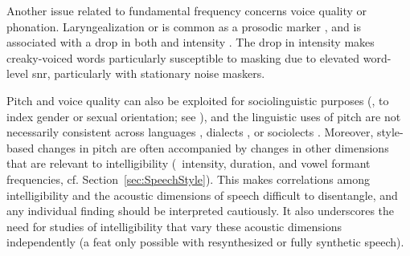 
Another issue related to fundamental frequency concerns voice quality or phonation.  Laryngealization or  is common as a prosodic marker \citep{Lehiste1979, Kreiman1982, DilleyEtAl1996}, and is associated with a drop in both \fo{} and intensity \citep{GordonLadefoged2001}.  The drop in intensity makes creaky-voiced words particularly susceptible to masking due to elevated word-level \ac{snr}, particularly with stationary noise maskers.  %

Pitch and voice quality can also be exploited for sociolinguistic purposes (\ie, to index gender or sexual orientation; see \citealt[\intal]{McconnellGinet1978, Gaudio1994, Podesva2011}), and the linguistic uses of pitch are not necessarily consistent across languages \citep{MajewskiEtAl1972, Todaka1993, Yuasa2008, KeatingKuo2012}, dialects \citep{GrabePost2002, ClopperSmiljanic2011}, or sociolects \citep{McLemore1991, Britain2008}.  %
Moreover, style-based changes in pitch are often accompanied by changes in other dimensions that are relevant to intelligibility (\viz\ intensity, duration, and vowel formant frequencies, cf. Section~\ref{sec:SpeechStyle}).  This makes correlations among intelligibility and the acoustic dimensions of speech difficult to disentangle, and any individual finding should be interpreted cautiously.  It also underscores the need for studies of intelligibility that vary these acoustic dimensions independently (a feat only possible with resynthesized or fully synthetic speech).

